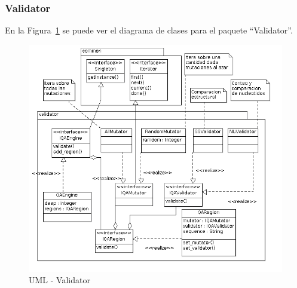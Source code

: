   \subsubsection{Validator}
  En la Figura~\ref{uml:lld-validator} se puede ver el diagrama de clases
para el paquete ``Validator''.
    \begin{figure}
      \centering
      \includegraphics[scale=0.5]{lld-validator.png}  
      \caption{UML - Validator}
      \label{uml:lld-validator}
    \end{figure}